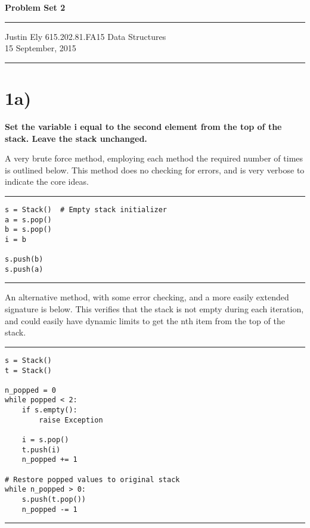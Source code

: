\documentclass[a4paper,11pt]{article}
\begin{document}
\begin{flushright}

\vspace{1.1cm}

{\bf\Huge Problem Set 2}

\rule{0.25\linewidth}{0.5pt}

\vspace{0.5cm}
Justin Ely
\linebreak
\newline
\footnotesize{615.202.81.FA15 Data Structures \\}
\vspace{0.5cm}
15 September, 2015
\end{flushright}

\noindent\rule{\linewidth}{1.0pt}


\section*{1a)}
{\bf Set the variable i equal to the second element from the top of the stack. Leave the stack unchanged. }

A very brute force method, employing each method the required number of times is outlined below.  This method does
no checking for errors, and is very verbose to indicate the core ideas. 

\noindent\rule{\linewidth}{0.1pt}
\begin{verbatim}
s = Stack()  # Empty stack initializer
a = s.pop()
b = s.pop()
i = b

s.push(b)
s.push(a)
\end{verbatim}
\noindent\rule{\linewidth}{0.1pt}

An alternative method, with some error checking, and a more easily extended signature is below.  This verifies that the 
stack is not empty during each iteration, and could easily have dynamic limits to get the nth item from the top of the stack.

\noindent\rule{\linewidth}{0.1pt}
\begin{verbatim}
s = Stack() 
t = Stack()

n_popped = 0
while popped < 2:
    if s.empty():
        raise Exception
    
    i = s.pop()
    t.push(i)
    n_popped += 1
    
# Restore popped values to original stack
while n_popped > 0:
    s.push(t.pop())
    n_popped -= 1
\end{verbatim}
\noindent\rule{\linewidth}{0.1pt}
\end{document}
